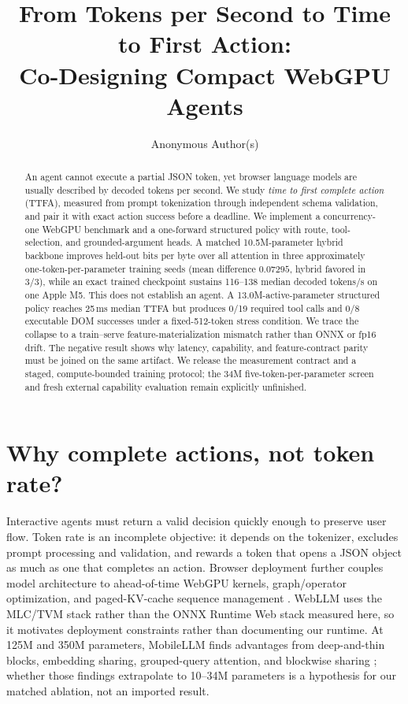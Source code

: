 \documentclass{article}
\title{From Tokens per Second to Time to First Action:\\
Co-Designing Compact WebGPU Agents}
\author{Anonymous Author(s)}
\begin{document}
\maketitle

\begin{abstract}
An agent cannot execute a partial JSON token, yet browser language models are usually described
by decoded tokens per second.  We study \emph{time to first complete action} (TTFA), measured from
prompt tokenization through independent schema validation, and pair it with exact action success
before a deadline.  We implement a concurrency-one WebGPU benchmark and a one-forward structured
policy with route, tool-selection, and grounded-argument heads.  A matched 10.5M-parameter hybrid
backbone improves held-out bits per byte over all attention in three approximately
one-token-per-parameter training seeds (mean difference \(0.07295\), hybrid favored in 3/3), while
an exact trained checkpoint sustains 116--138 median decoded tokens/s on one Apple M5.  This does
not establish an agent.  A 13.0M-active-parameter structured policy reaches 25\,ms median TTFA but
produces 0/19 required tool calls and 0/8 executable DOM successes under a fixed-512-token stress
condition.  We trace the collapse to a train--serve feature-materialization mismatch rather than
ONNX or fp16 drift.  The negative result shows why latency, capability, and feature-contract
parity must be joined on the same artifact.  We release the measurement contract and a staged,
compute-bounded training protocol; the 34M five-token-per-parameter screen and fresh external
capability evaluation remain explicitly unfinished.
\end{abstract}

\section{Why complete actions, not token rate?}

Interactive agents must return a valid decision quickly enough to preserve user flow.  Token rate
is an incomplete objective: it depends on the tokenizer, excludes prompt processing and
validation, and rewards a token that opens a JSON object as much as one that completes an action.
Browser deployment further couples model architecture to ahead-of-time WebGPU kernels,
graph/operator optimization, and paged-KV-cache sequence management \citep{ruan2026webllm}.
WebLLM uses the MLC/TVM stack rather than the ONNX Runtime Web stack measured here, so it motivates
deployment constraints rather than documenting our runtime.  At 125M and 350M parameters,
MobileLLM finds advantages from deep-and-thin blocks, embedding sharing, grouped-query attention,
and blockwise sharing \citep{liu2024mobilellm}; whether those findings extrapolate to 10--34M
parameters is a hypothesis for our matched ablation, not an imported result.
\end{document}

